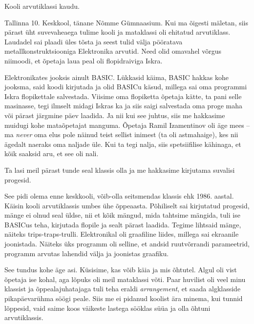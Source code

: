 


Kooli arvutiklassi kaudu.


Tallinna 10. Keskkool, tänane Nõmme 
Gümnaasium. Kui ma 
õigesti mäletan, siis pärast üht suvevaheaega tulime kooli ja 
mataklassi oli ehitatud arvutiklass. Laudadel sai plaadi üles tõsta ja seest tulid 
välja pööratava metallkonstruktsiooniga 
Elektronika arvutid. Need olid omavahel võrgus 
niimoodi, et õpetaja laua peal oli flopidraiviga 
Iskra. 

Elektronikates jooksis ainult BASIC. 
Lükkasid käima, BASIC hakkas kohe jooksma, said koodi 
kirjutada ja olid BASICu käsud, millega sai oma programmi Iskra flopikettale salvestada. Viisime oma flopiketta õpetaja kätte, ta pani selle masinasse, tegi ilmselt midagi Iskras ka ja 
siis saigi salvestada oma proge maha või pärast järgmine päev laadida. Ja nii 
kui see juhtus, siis me hakkasime muidugi kohe mataõpetajat manguma. Õpetaja 
Ramil Izamentinov oli äge 
mees -- ma \emph{never} oma elus pole näinud teist sellist inimest (ta oli astmahaige), 
kes nii ägedalt naeraks oma naljade üle. Kui 
ta tegi nalja, siis spetsiifilise kähinaga, et kõik saaksid aru, et see oli nali. 

Ta lasi meil pärast tunde seal klassis olla ja me 
hakkasime kirjutama suvalisi progesid. 


See pidi olema enne keskkooli, võib-olla seitsmendas 
klassis ehk 1986. aastal. Käisin kooli arvutiklassis 
umbes ühe õppeaasta. Põhiliselt sai kirjutatud progesid, 
mänge ei olnud seal üldse, nii et kõik mängud, mida 
tahtsime mängida, tuli ise BASICus teha, kirjutada flopile ja sealt pärast laadida. Tegime
lihtsaid mänge, näiteks trips-traps-trulli. Elektronikal oli graafiline liides, millega
sai ekraanile joonistada. Näiteks üks programm oli 
selline, et andsid ruutvõrrandi parameetrid, programm arvutas lahendid välja ja joonistas 
graafiku. 


See tundus kohe äge asi. Küsisime, kas 
võib käia ja mis õhtutel. Algul oli vist õpetaja ise kohal, 
aga lõpuks oli meil mataklassi võti. Paar huvilist 
oli veel minu klassist ja õppealajuhatajaga tuli teha eraldi \emph{arrangement}, et saada algklasside pikapäevarühma söögi 
peale. Siis me ei pidanud koolist ära minema, kui tunnid lõppesid, vaid saime koos
väikeste lastega sööklas süüa ja olla õhtuni arvutiklassis. 

